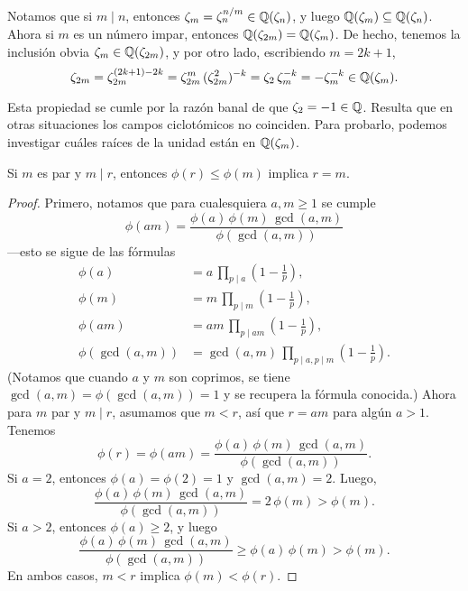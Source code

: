 Notamos que si $m \mid n$, entonces $\zeta_m = \zeta_n^{n/m} \in \mathbb{Q} (\zeta_n)$,
y luego $\mathbb{Q} (\zeta_m) \subseteq \mathbb{Q} (\zeta_n)$. Ahora si $m$ es un número
impar, entonces $\mathbb{Q} (\zeta_{2m}) = \mathbb{Q} (\zeta_m)$. De hecho, tenemos la
inclusión obvia $\zeta_m \in \mathbb{Q} (\zeta_{2m})$, y por otro lado, escribiendo
$m = 2k + 1$,
\[ \zeta_{2m} = \zeta_{2m}^{(2k+1) - 2k}
             = \zeta_{2m}^{m}\,(\zeta_{2m}^2)^{-k}
             = \zeta_2\,\zeta_m^{-k}
             = -\zeta_m^{-k} \in \mathbb{Q} (\zeta_m). \]

Esta propiedad se cumle por la razón banal de que
$\zeta_2 = -1 \in \mathbb{Q}$. Resulta que en otras situaciones los campos ciclotómicos
no coinciden. Para probarlo, podemos investigar cuáles raíces de la unidad están
en $\mathbb{Q} (\zeta_m)$.

\begin{lema}
  \label{lema:phi-de-Euler}
  Si $m$ es par y $m\mid r$, entonces $\phi (r) \le \phi (m)$ implica $r = m$.

  \begin{proof}
    Primero, notamos que para cualesquiera $a,m \ge 1$ se cumple
    $$\phi (am) = \frac{\phi (a)\,\phi (m)\,\gcd (a,m)}{\phi (\gcd (a,m))}$$
    ---esto se sigue de las fórmulas
    \begin{align*}
      \phi (a) & = a\,\prod_{p\mid a} \left(1 - \frac{1}{p}\right),\\
      \phi (m) & = m\,\prod_{p\mid m} \left(1 - \frac{1}{p}\right),\\
      \phi (am) & = am\,\prod_{p\mid am} \left(1 - \frac{1}{p}\right),\\
      \phi (\gcd (a,m)) & = \gcd (a,m)\,\prod_{p \mid a, p \mid m} \left(1 - \frac{1}{p}\right).
    \end{align*}
    (Notamos que cuando $a$ y $m$ son coprimos, se tiene
    $\gcd (a,m) = \phi (\gcd (a,m)) = 1$ y se recupera la fórmula conocida.)
    Ahora para $m$ par y $m\mid r$, asumamos que $m < r$, así que $r = am$ para
    algún $a > 1$. Tenemos
    \[ \phi (r) = \phi (am) =
       \frac{\phi (a)\,\phi(m)\,\gcd (a,m)}{\phi (\gcd (a,m))}. \]
    Si $a = 2$, entonces $\phi (a) = \phi (2) = 1$ y $\gcd (a,m) = 2$. Luego,
    \[ \frac{\phi (a)\,\phi(m)\,\gcd (a,m)}{\phi (\gcd (a,m))} =
       2\,\phi(m) > \phi (m). \]
    Si $a > 2$, entonces $\phi (a) \ge 2$, y luego
    \[ \frac{\phi (a)\,\phi(m)\,\gcd (a,m)}{\phi (\gcd (a,m))} \ge
       \phi (a)\,\phi(m) > \phi (m). \]
    En ambos casos, $m < r$ implica $\phi (m) < \phi (r)$.
  \end{proof}
\end{lema}

